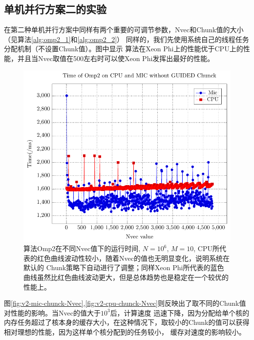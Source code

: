 \subsection{单机并行方案二的实验} %
\label{sub:bsV2}
在第二种单机并行方案中同样有两个重要的可调节参数，Nvec和Chunk值的大小（见算法\ref{alg:omp2_1}和\ref{alg:omp2_2}）
同样的，我们先使用系统自己的线程任务分配机制（不设置Chunk值）。图\label{fig:v2-Nvec}中显示
算法在Xeon Phi上的性能优于CPU上的性能，并且当Nvec取值在500左右时可以使Xeon Phi发挥出最好的性能。
\begin{figure}[!t]
   \centering
   \includegraphics[width=\textwidth]{chap5/Figures/bsV2-6-mic-cpu-Time-Chunck-0.pdf}
   \caption{算法Omp2在不同Nvec值下的运行时间, $N=10^6$, $M=10$, CPU所代表的红色曲线波动性较小，随着Nvec的值也无明显变化，说明系统在默认的
   Chunk策略下自动进行了调整；同样Xeon Phi所代表的蓝色曲线虽然比红色曲线波动更大，但是总体趋势也是稳定在一个较优的性能上。}
   \label{fig:v2-Nvec}
\end{figure}
图\ref{fig:v2-mic-chunck-Nvec},\ref{fig:v2-cpu-chunck-Nvec}则反映出了取不同的Chunk值对性能的影响。当Nvec的值大于$10^3$后，计算速度
迅速下降，因为分配给单个核的内存任务超过了核本身的缓存大小，在这种情况下，取较小的Chunk的值可以获得相对理想的性能，因为这样单个核分配到的任务较小，
缓存对速度的影响较小。
